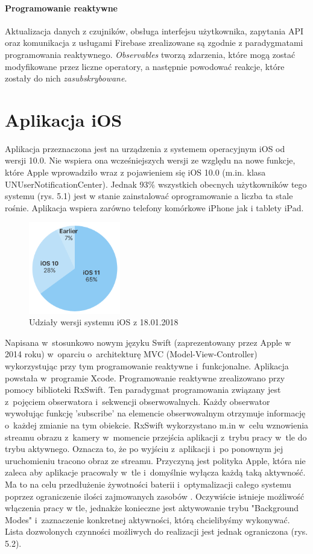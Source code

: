 \documentclass[polish,bachelor,a4paper,oneside]{ppfcmthesis}
\begin{document}
    \paragraph{Programowanie reaktywne} Aktualizacja danych z czujników, obsługa interfejsu użytkownika, zapytania API oraz komunikacja z usługami Firebase zrealizowane są zgodnie z paradygmatami programowania reaktywnego.
    \textit{Observables} tworzą zdarzenia, które mogą zostać modyfikowane przez liczne operatory, a następnie powodować reakcje, które zostały do nich \textit{zasubskrybowane}.

    \section{Aplikacja iOS}
    Aplikacja przeznaczona jest na urządzenia z systemem operacyjnym iOS od wersji 10.0.
    Nie wspiera ona wcześniejszych wersji ze względu na nowe funkcje, które Apple wprowadziło wraz z pojawieniem się iOS 10.0 (m.in. klasa UNUserNotificationCenter). Jednak 93\% wszystkich obecnych użytkowników tego systemu (rys. 5.1) jest w stanie zainstalować oprogramowanie a liczba ta stale rośnie. Aplikacja wspiera zarówno telefony komórkowe iPhone jak i tablety iPad.
    \begin{figure}[H]
        \centering
        \includegraphics[width=4cm]{ios_screenshots/iOSstat.png}
        \caption{Udziały wersji systemu iOS z 18.01.2018 \protect\cite{iosversions}}
    \end{figure}
    Napisana w~stosunkowo nowym języku Swift (zaprezentowany przez Apple w 2014 roku) w~oparciu o~architekturę MVC (Model-View-Controller) wykorzystując przy tym programowanie reaktywne i~funkcjonalne. Aplikacja powstała w~programie Xcode. Programowanie reaktywne zrealizowano przy pomocy biblioteki RxSwift. Ten paradygmat programowania związany jest z~pojęciem obserwatora i~sekwencji obserwowalnych. Każdy obserwator wywołując funkcję 'subscribe' na elemencie obserwowalnym otrzymuje informację o~każdej zmianie na tym obiekcie. RxSwift wykorzystano m.in w~celu wznowienia streamu obrazu z~kamery w~momencie przejścia aplikacji z~trybu pracy w~tle do trybu aktywnego. Oznacza to, że po wyjściu z~aplikacji i~po ponownym jej uruchomieniu tracono obraz ze streamu. Przyczyną jest polityka Apple, która nie zaleca aby aplikacje pracowały w~tle i~domyślnie wyłącza każdą taką aktywność. Ma to na celu przedłużenie żywotności baterii i~optymalizacji całego systemu poprzez ograniczenie ilości zajmowanych zasobów \cite{backgroundmodes}.  Oczywiście istnieje możliwość włączenia pracy w tle, jednakże konieczne jest aktywowanie trybu "Background Modes" i~zaznaczenie konkretnej aktywności, którą chcielibyśmy wykonywać. Lista dozwolonych czynności możliwych do realizacji jest jednak ograniczona (rys. 5.2).
\end{document}
